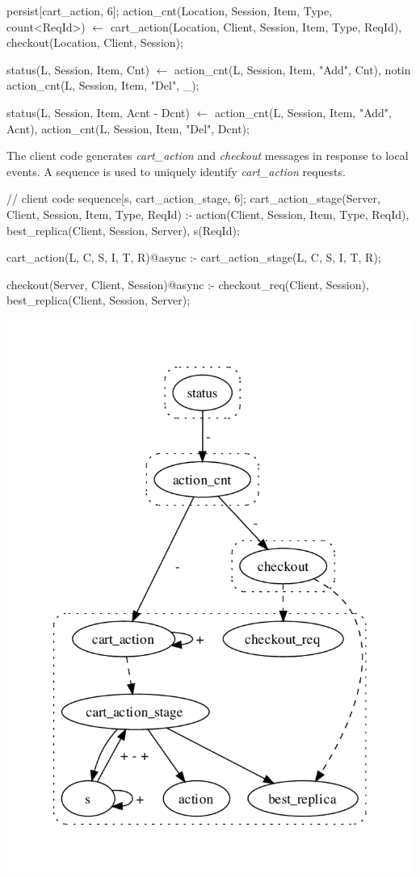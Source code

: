 \begin{Dedalus}
persist[cart_action, 6];
action_cnt(Location, Session, Item, Type, count<ReqId>) \(\leftarrow\)
    cart_action(Location, Client, Session, Item, Type, ReqId),
    checkout(Location, Client, Session);

status(L, Session, Item, Cnt) \(\leftarrow\)
    action_cnt(L, Session, Item, "Add", Cnt),
    notin action_cnt(L, Session, Item, "Del", _);

status(L, Session, Item, Acnt - Dcnt) \(\leftarrow\)
    action_cnt(L, Session, Item, "Add", Acnt),
    action_cnt(L, Session, Item, "Del", Dcnt);
\end{Dedalus}

The client code generates {\em cart\_action} and {\em checkout} messages in response
to local events.  A sequence is used to uniquely identify {\em cart\_action} requests.

\begin{Dedalus}
// client code
sequence[s, cart_action_stage, 6];
cart_action_stage(Server, Client, Session, Item, Type, ReqId) :-
  action(Client, Session, Item, Type, ReqId),
  best_replica(Client, Session, Server),
  s(ReqId);

cart_action(L, C, S, I, T, R)@async :-
  cart_action_stage(L, C, S, I, T, R);

checkout(Server, Client, Session)@async :-
  checkout_req(Client, Session),
  best_replica(Client, Session, Server);

\end{Dedalus}



\includegraphics[width=0.9\linewidth]{vizza_brick.pdf}

